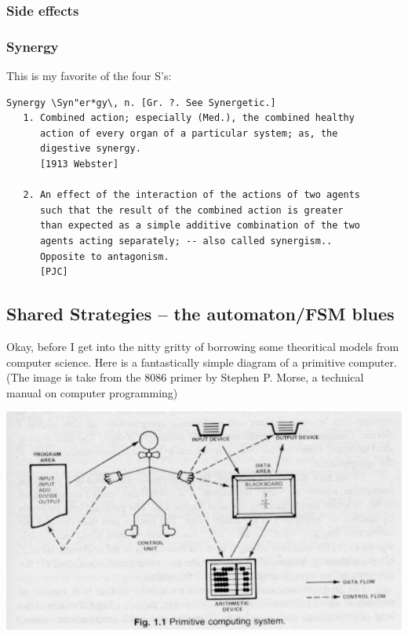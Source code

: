 \documentclass[11pt]{article}
\begin{document}
\subsubsection{Side effects}
\label{sec:org934d4b1}


\subsubsection{Synergy}
\label{sec:orgaaa48e6}
This is my favorite of the four S's:

\begin{verbatim}
Synergy \Syn"er*gy\, n. [Gr. ?. See Synergetic.]
   1. Combined action; especially (Med.), the combined healthy
      action of every organ of a particular system; as, the
      digestive synergy.
      [1913 Webster]

   2. An effect of the interaction of the actions of two agents
      such that the result of the combined action is greater
      than expected as a simple additive combination of the two
      agents acting separately; -- also called synergism..
      Opposite to antagonism.
      [PJC]
\end{verbatim}


\subsection{Shared Strategies – the automaton/FSM blues}
\label{sec:org5f60af6}

Okay, before I get into the nitty gritty of borrowing some theoritical models 
from computer science. Here is a fantastically simple diagram of a primitive 
computer. (The image is take from the 8086 primer by Stephen P. Morse, a technical
manual on computer programming)

\begin{center}
\includegraphics[width=.9\linewidth]{../img/primitiveComputer.png}
\end{center}
\end{document}
